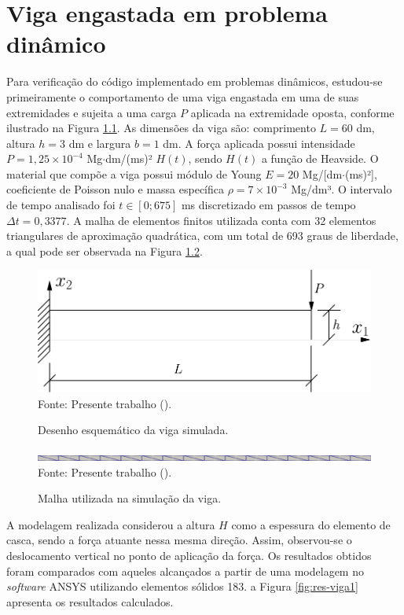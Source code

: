\chapter[APÊNDICE \ref{Ap:DinBeam}]{Viga engastada em problema dinâmico}
\label{Ap:DinBeam}

Para verificação do código implementado em problemas dinâmicos, estudou-se  primeiramente o comportamento de uma viga engastada em uma de suas extremidades e sujeita a uma carga $P$ aplicada na extremidade oposta, conforme ilustrado na Figura \ref{fig:viga1}. As dimensões da viga são: comprimento $L=60$ dm, altura $h=3$ dm e largura $b=1$ dm. A força aplicada possui intensidade $P=1,25\times10^{-4}$ Mg$\cdot$dm/(ms)² $H(t)$, sendo $H(t)$ a função de Heavside. O material que compõe a viga possui módulo de Young $E=20$ Mg/[dm$\cdot$(ms)²], coeficiente de Poisson nulo e massa específica $\rho=7\times10^{-3}$ Mg/dm³. O intervalo de tempo analisado foi $t\in[0;675]$ ms discretizado em passos de tempo $\Delta t=0,3377$. A malha de elementos finitos utilizada conta com 32 elementos triangulares de aproximação quadrática, com um total de 693 graus de liberdade, a qual pode ser observada na Figura \ref{fig:viga1-mesh}.

\begin{figure}[h!]
    \centering
    \caption{Desenho esquemático da viga simulada.}
    \includegraphics[width=0.5\linewidth]{Figuras/vigas/viga1.pdf}
    \\Fonte: Presente trabalho (\the\year).
    \label{fig:viga1}
\end{figure}

\begin{figure}[h!]
    \centering
    \caption{Malha utilizada na simulação da viga.}
    \includegraphics[width=\linewidth]{Figuras/vigas/mesh1.png}
    \\Fonte: Presente trabalho (\the\year).
    \label{fig:viga1-mesh}
\end{figure}

A modelagem realizada considerou a altura $H$ como a espessura do elemento de casca, sendo a força atuante nessa mesma direção. Assim, observou-se o deslocamento vertical no ponto de aplicação da força. Os resultados obtidos foram comparados com aqueles alcançados a partir de uma modelagem no \textit{software} ANSYS utilizando elementos sólidos 183. a Figura \ref{fig:res-viga1} apresenta os resultados calculados.

